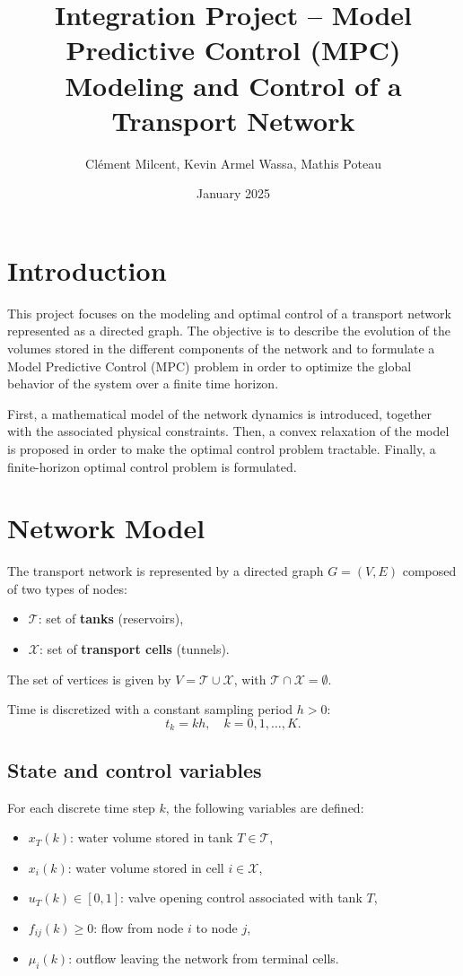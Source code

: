 \documentclass[12pt]{article}
\title{Integration Project -- Model Predictive Control (MPC)\\[0.3cm]
Modeling and Control of a Transport Network}
\author{Clément Milcent, Kevin Armel Wassa, Mathis Poteau}
\date{January 2025}
\begin{document}
\maketitle

\newpage
\tableofcontents
\newpage

\section{Introduction}

This project focuses on the modeling and optimal control of a transport network represented as a directed graph.  
The objective is to describe the evolution of the volumes stored in the different components of the network and to formulate a Model Predictive Control (MPC) problem in order to optimize the global behavior of the system over a finite time horizon.

First, a mathematical model of the network dynamics is introduced, together with the associated physical constraints.  
Then, a convex relaxation of the model is proposed in order to make the optimal control problem tractable.  
Finally, a finite-horizon optimal control problem is formulated.

\section{Network Model}

The transport network is represented by a directed graph $G = (V,E)$ composed of two types of nodes:
\begin{itemize}
    \item $\mathcal{T}$: set of \textbf{tanks} (reservoirs),
    \item $\mathcal{X}$: set of \textbf{transport cells} (tunnels).
\end{itemize}

The set of vertices is given by $V = \mathcal{T} \cup \mathcal{X}$, with $\mathcal{T} \cap \mathcal{X} = \emptyset$.

Time is discretized with a constant sampling period $h > 0$:
\[
t_k = k h, \quad k = 0,1,\dots,K.
\]

\subsection{State and control variables}

For each discrete time step $k$, the following variables are defined:
\begin{itemize}
    \item $x_T(k)$: water volume stored in tank $T \in \mathcal{T}$,
    \item $x_i(k)$: water volume stored in cell $i \in \mathcal{X}$,
    \item $u_T(k) \in [0,1]$: valve opening control associated with tank $T$,
    \item $f_{ij}(k) \ge 0$: flow from node $i$ to node $j$,
    \item $\mu_i(k)$: outflow leaving the network from terminal cells.
\end{itemize}
\end{document}
